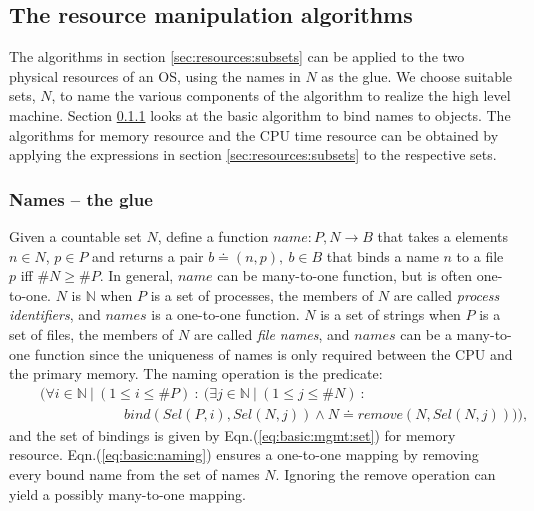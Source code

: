 \documentclass[draft]{article}
\def\names{\doteq}
\def\eqn#1{Eqn.(\ref{#1})}
\begin{document}
\subsection{The resource manipulation algorithms}
\label{sec:manage:algos}

The algorithms  in section \ref{sec:resources:subsets}  can be applied
to the two physical resources of an  OS, using the names in $N$ as the
glue.  We choose suitable sets, $N$, to name the various components of
the   algorithm  to   realize   the  high   level  machine.    Section
\ref{sec:basic:name:management} looks  at the basic  algorithm to bind
names to objects.  The algorithms for memory resource and the CPU time
resource  can  be obtained  by  applying  the  expressions in  section
\ref{sec:resources:subsets} to the respective sets.

\subsubsection{Names -- the glue}
\label{sec:basic:name:management}

Given a countable  set $N$, define a function  $name: P, N \rightarrow
B$ that takes  a elements $n \in N$,  $p \in P$ and returns  a pair $b
\names (n, p),\ b \in B$ that binds  a name $n$ to a file $p$ iff $\#N
\ge  \#P$.  In  general, $name$  can be  many-to-one function,  but is
often one-to-one.  $N$ is $\mathbb{N}$ when $P$ is a set of processes,
the members of $N$  are called \emph{process identifiers}, and $names$
is a one-to-one function.   $N$ is a set of strings when  $P$ is a set
of files, the members of $N$ are called \emph{file names}, and $names$
can be  a many-to-one function since  the uniqueness of  names is only
required between the CPU and the primary memory.  The naming operation
is the predicate:
\begin{eqnarray}
  \label{eq:basic:naming}
  &~&
  \biggl(
  \forall i \in \mathbb{N}\ \vert\ (1 \le i \le \#P)\ :\ 
  \bigl(\exists j \in \mathbb{N}\ \vert\ (1 \le
  j \le \#N)\ : 
  \nonumber \\
  &~& \quad \quad \quad \quad \quad \quad bind (Sel(P, i), Sel(N, j)) 
  \wedge N \names remove (N, Sel(N, j)) 
  \bigr)\biggr),
\end{eqnarray}
and the set of bindings is given by \eqn{eq:basic:mgmt:set} for memory
resource.
\eqn{eq:basic:naming} ensures  a one-to-one mapping  by removing every
bound name from  the set of names $N$.   Ignoring the remove operation
can yield a possibly many-to-one mapping.
\end{document}
